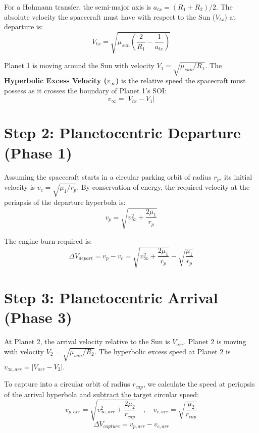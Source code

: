 \documentclass[12pt]{article}
\begin{document}
For a Hohmann transfer, the semi-major axis is $a_{tx} = (R_1 + R_2)/2$. The absolute velocity the spacecraft must have with respect to the Sun ($V_{tx}$) at departure is:
\begin{equation}
    V_{tx} = \sqrt{\mu_{sun} \left( \frac{2}{R_1} - \frac{1}{a_{tx}} \right)}
\end{equation}

Planet 1 is moving around the Sun with velocity $V_1 = \sqrt{\mu_{sun}/R_1}$. The \textbf{Hyperbolic Excess Velocity ($v_\infty$)} is the relative speed the spacecraft must possess as it crosses the boundary of Planet 1's SOI:
\begin{equation}
    v_{\infty} = | V_{tx} - V_1 |
\end{equation}

\section*{Step 2: Planetocentric Departure (Phase 1)}
Assuming the spacecraft starts in a circular parking orbit of radius $r_p$, its initial velocity is $v_c = \sqrt{\mu_1 / r_p}$. By conservation of energy, the required velocity at the periapsis of the departure hyperbola is:
\begin{equation}
    v_p = \sqrt{v_{\infty}^2 + \frac{2\mu_1}{r_p}}
\end{equation}

The engine burn required is:
\begin{equation}
    \Delta V_{depart} = v_p - v_c = \sqrt{v_{\infty}^2 + \frac{2\mu_1}{r_p}} - \sqrt{\frac{\mu_1}{r_p}}
\end{equation}

\section*{Step 3: Planetocentric Arrival (Phase 3)}
At Planet 2, the arrival velocity relative to the Sun is $V_{arr}$. Planet 2 is moving with velocity $V_2 = \sqrt{\mu_{sun}/R_2}$. The hyperbolic excess speed at Planet 2 is $v_{\infty, arr} = | V_{arr} - V_2 |$.

To capture into a circular orbit of radius $r_{cap}$, we calculate the speed at periapsis of the arrival hyperbola and subtract the target circular speed:
\begin{equation}
    v_{p, arr} = \sqrt{v_{\infty, arr}^2 + \frac{2\mu_2}{r_{cap}}} \quad , \quad v_{c, arr} = \sqrt{\frac{\mu_2}{r_{cap}}}
\end{equation}
\begin{equation}
    \Delta V_{capture} = v_{p, arr} - v_{c, arr}
\end{equation}
\end{document}
